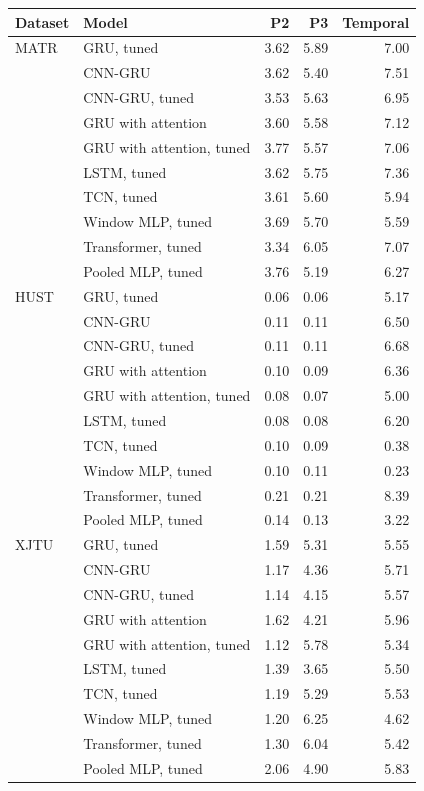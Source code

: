 \begin{tabular}{llrrr}
\toprule
Dataset & Model & P2 & P3 & Temporal \\
\midrule
MATR & GRU, tuned & 3.62 & 5.89 & 7.00 \\
 & CNN-GRU & 3.62 & 5.40 & 7.51 \\
 & CNN-GRU, tuned & 3.53 & 5.63 & 6.95 \\
 & GRU with attention & 3.60 & 5.58 & 7.12 \\
 & GRU with attention, tuned & 3.77 & 5.57 & 7.06 \\
 & LSTM, tuned & 3.62 & 5.75 & 7.36 \\
 & TCN, tuned & 3.61 & 5.60 & 5.94 \\
 & Window MLP, tuned & 3.69 & 5.70 & 5.59 \\
 & Transformer, tuned & 3.34 & 6.05 & 7.07 \\
 & Pooled MLP, tuned & 3.76 & 5.19 & 6.27 \\
HUST & GRU, tuned & 0.06 & 0.06 & 5.17 \\
 & CNN-GRU & 0.11 & 0.11 & 6.50 \\
 & CNN-GRU, tuned & 0.11 & 0.11 & 6.68 \\
 & GRU with attention & 0.10 & 0.09 & 6.36 \\
 & GRU with attention, tuned & 0.08 & 0.07 & 5.00 \\
 & LSTM, tuned & 0.08 & 0.08 & 6.20 \\
 & TCN, tuned & 0.10 & 0.09 & 0.38 \\
 & Window MLP, tuned & 0.10 & 0.11 & 0.23 \\
 & Transformer, tuned & 0.21 & 0.21 & 8.39 \\
 & Pooled MLP, tuned & 0.14 & 0.13 & 3.22 \\
XJTU & GRU, tuned & 1.59 & 5.31 & 5.55 \\
 & CNN-GRU & 1.17 & 4.36 & 5.71 \\
 & CNN-GRU, tuned & 1.14 & 4.15 & 5.57 \\
 & GRU with attention & 1.62 & 4.21 & 5.96 \\
 & GRU with attention, tuned & 1.12 & 5.78 & 5.34 \\
 & LSTM, tuned & 1.39 & 3.65 & 5.50 \\
 & TCN, tuned & 1.19 & 5.29 & 5.53 \\
 & Window MLP, tuned & 1.20 & 6.25 & 4.62 \\
 & Transformer, tuned & 1.30 & 6.04 & 5.42 \\
 & Pooled MLP, tuned & 2.06 & 4.90 & 5.83 \\

\end{tabular}
